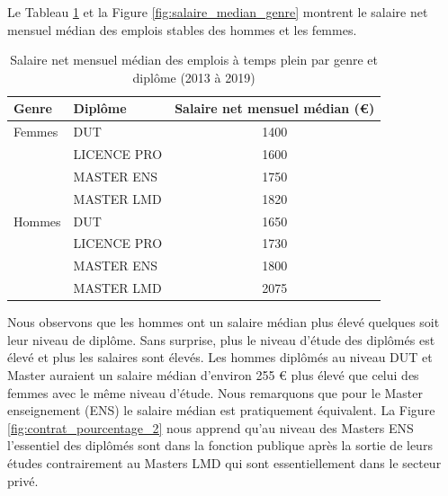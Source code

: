 \documentclass[12pt, a4paper, titlepage, table]{article}
\begin{document}
	Le Tableau \ref{tab:salaire_median_genre} et la Figure \ref{fig:salaire_median_genre} montrent le salaire net mensuel médian des emplois stables des hommes et les femmes. 
	
	\begin{table}[H]
		\centering
		\begin{tabular}{llc}
			\toprule
			\textbf{Genre} & \textbf{Diplôme} & \textbf{Salaire net mensuel médian (€)} \\
			\midrule
			Femmes & DUT & 1400 \\
			& LICENCE PRO & 1600 \\
			& MASTER ENS & 1750 \\
			& MASTER LMD & 1820 \\
			\midrule
			Hommes & DUT & 1650 \\
			& LICENCE PRO & 1730 \\
			& MASTER ENS & 1800 \\
			& MASTER LMD & 2075 \\
			\bottomrule
		\end{tabular}
		\caption{Salaire net mensuel médian des emplois à temps plein par genre et diplôme (2013 à 2019)}
		\label{tab:salaire_median_genre}
	\end{table}
	
	
	
	Nous observons que les hommes ont un salaire médian plus élevé quelques soit leur niveau de diplôme.
	Sans surprise, plus le niveau d'étude des diplômés est élevé et plus les salaires sont élevés.
	Les hommes diplômés au niveau DUT et Master auraient un salaire médian d'environ 255 € plus élevé que celui des femmes avec le même niveau d'étude.
	Nous remarquons que pour le Master enseignement (ENS) le salaire médian est pratiquement équivalent.  
	La Figure \ref{fig:contrat_pourcentage_2} nous apprend qu'au niveau des Masters ENS l'essentiel des diplômés sont dans la fonction publique après la sortie de leurs études contrairement au Masters LMD qui sont essentiellement dans le secteur privé.
		
\end{document}
